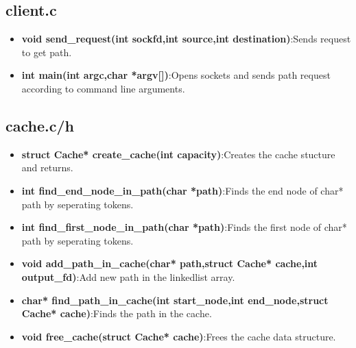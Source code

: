 \documentclass{article}
\begin{document}
\subsection{client.c}
\begin{itemize}
    \item \textbf{void send\_request(int sockfd,int source,int destination)}:Sends request to get path.
    \item \textbf{int main(int argc,char *argv[])}:Opens sockets and sends path request according to command line arguments.
\end{itemize}

\subsection{cache.c/h}
\begin{itemize}
    \item \textbf{struct Cache* create\_cache(int capacity)}:Creates the cache stucture and returns.
    \item \textbf{int find\_end\_node\_in\_path(char *path)}:Finds the end node of char* path by seperating tokens.
    \item \textbf{int find\_first\_node\_in\_path(char *path)}:Finds the first node of char* path by seperating tokens.
    \item \textbf{void add\_path\_in\_cache(char* path,struct Cache* cache,int output\_fd)}:Add new path in the linkedlist array.
    \item \textbf{char* find\_path\_in\_cache(int start\_node,int end\_node,struct Cache* cache)}:Finds the path in the cache.
    \item \textbf{void free\_cache(struct Cache* cache)}:Frees the cache data structure.
\end{itemize}

\newpage
\end{document}
